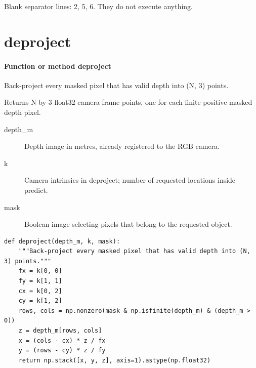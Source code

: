 \documentclass[11pt,a4paper]{book}
\begin{document}
Blank separator lines: 2, 5, 6. They do not execute anything.

\section{deproject}

\paragraph{Function or method deproject}
Back-project every masked pixel that has valid depth into (N, 3) points.

Returns N by 3 float32 camera-frame points, one for each finite positive masked depth pixel.

\begin{description}
\item[depth\_m] Depth image in metres, already registered to the RGB camera.
\item[k] Camera intrinsics in deproject; number of requested locations inside predict.
\item[mask] Boolean image selecting pixels that belong to the requested object.
\end{description}

\begin{lstlisting}[firstnumber=7]
def deproject(depth_m, k, mask):
    """Back-project every masked pixel that has valid depth into (N, 3) points."""
    fx = k[0, 0]
    fy = k[1, 1]
    cx = k[0, 2]
    cy = k[1, 2]
    rows, cols = np.nonzero(mask & np.isfinite(depth_m) & (depth_m > 0))
    z = depth_m[rows, cols]
    x = (cols - cx) * z / fx
    y = (rows - cy) * z / fy
    return np.stack([x, y, z], axis=1).astype(np.float32)


\end{lstlisting}
\end{document}
